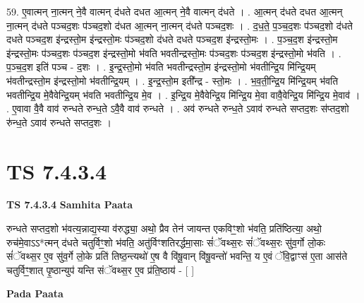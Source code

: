 \documentclass[17pt]{extarticle}
\begin{document}
59. ए॒वात्मन् ना॒त्मन् ने॒वै वात्मन् द॑धते दधत आ॒त्मन् ने॒वै वात्मन् द॑धते । . आ॒त्मन् द॑धते दधत आ॒त्मन् ना॒त्मन् द॑धते पञ्चद॒शः प॑ञ्चद॒शो द॑धत आ॒त्मन् ना॒त्मन् द॑धते पञ्चद॒शः । . द॒ध॒ते॒ प॒ञ्च॒द॒शः प॑ञ्चद॒शो द॑धते दधते पञ्चद॒श इ॑न्द्रस्तो॒म इ॑न्द्रस्तो॒मः प॑ञ्चद॒शो द॑धते दधते पञ्चद॒श इ॑न्द्रस्तो॒मः । . प॒ञ्च॒द॒श इ॑न्द्रस्तो॒म इ॑न्द्रस्तो॒मः प॑ञ्चद॒शः प॑ञ्चद॒श इ॑न्द्रस्तो॒मो भ॑वति भवतीन्द्रस्तो॒मः प॑ञ्चद॒शः प॑ञ्चद॒श इ॑न्द्रस्तो॒मो भ॑वति । . प॒ञ्च॒द॒श इति॑ पञ्च - द॒शः । . इ॒न्द्र॒स्तो॒मो भ॑वति भवतीन्द्रस्तो॒म इ॑न्द्रस्तो॒मो भ॑वतीन्द्रि॒य मि॑न्द्रि॒यम् भ॑वतीन्द्रस्तो॒म इ॑न्द्रस्तो॒मो 
भ॑वतीन्द्रि॒यम् । . इ॒न्द्र॒स्तो॒म इती᳚न्द्र - स्तो॒मः । . भ॒व॒ती॒न्द्रि॒य मि॑न्द्रि॒यम् भ॑वति भवतीन्द्रि॒य मे॒वैवेन्द्रि॒यम् भ॑वति भवतीन्द्रि॒य मे॒व । . इ॒न्द्रि॒य मे॒वैवेन्द्रि॒य मि॑न्द्रि॒य मे॒वा वावै॒वेन्द्रि॒य मि॑न्द्रि॒य मे॒वाव॑ । . ए॒वावा वै॒वै वाव॑ रुन्धते रुन्ध॒ते ऽवै॒वै वाव॑ रुन्धते । . अव॑ रुन्धते रुन्ध॒ते ऽवाव॑ रुन्धते सप्तद॒शः स॑प्तद॒शो रु॑न्ध॒ते ऽवाव॑ रुन्धते सप्तद॒शः । \newline
\pagebreak
{}

\section{ TS 7.4.3.4 }

\textbf{TS 7.4.3.4 } \newline
\textbf{Samhita Paata} \newline

रुन्धते सप्तद॒शो भ॑वत्य॒न्नाद्य॒स्या व॑रुद्ध्या॒ अथो॒ प्रैव तेन॑ जायन्त एकविꣳ॒॒शो भ॑वति॒ प्रति॑ष्ठित्या॒ अथो॒ रुच॑मे॒वाऽऽ*त्मन् द॑धते चतुर्विꣳ॒॒शो भ॑वति॒ अतु॑र्विꣳशतिरर्द्धमा॒साः सं॑ॅवथ्स॒रः सं॑ॅवथ्स॒रः सु॑व॒र्गो लो॒कः सं॑ॅवथ्स॒र ए॒व सु॑व॒र्गे लो॒के प्रति॑ तिष्ठ॒न्त्यथो॑ ए॒ष वै वि॑षू॒वान् वि॑षू॒वन्तो॑ भवन्ति॒ य ए॒वं ॅवि॒द्वाꣳस॑ ए॒ता आस॑ते चतुर्विꣳ॒॒शात् पृ॒ष्ठान्युप॑ यन्ति संॅवथ्स॒र ए॒व प्र॑ति॒ष्ठाय॑ - [  ] \newline

\textbf{Pada Paata} \newline
\end{document}
